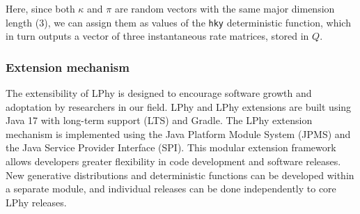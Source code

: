 \documentclass[10pt,letterpaper,table]{article}
\begin{document}
Here, since both $\kappa$ and $\pi$ are random vectors with the same major dimension length (3), we can assign them as values of the \texttt{hky} deterministic function, which in turn outputs a vector of three instantaneous rate matrices, stored in $Q$.



\subsubsection{Extension mechanism}
The extensibility of LPhy is designed to encourage software growth and adoptation by researchers in our field. 
LPhy and LPhy extensions are built using Java 17 with long-term support (LTS) and Gradle. 
The LPhy extension mechanism is implemented using the Java Platform Module System (JPMS) and the Java Service Provider Interface (SPI).
This modular extension framework allows developers greater flexibility in code development and software releases. 
New generative distributions and deterministic functions can be developed within a separate module, and individual releases can be done independently to core LPhy releases. 


\end{document}
